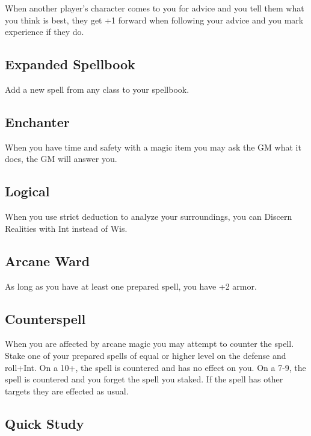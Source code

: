 When another player's character comes to you for advice and you tell them what you think is best, they get +1 forward when following your advice and you mark experience if they do.

 
\subsection{Expanded Spellbook}    
 

Add a new spell from any class to your spellbook.

 
\subsection{Enchanter}   
 

When you have time and safety with a magic item you may ask the GM what it does, the GM will answer you.

 
\subsection{Logical}   
 

When you use strict deduction to analyze your surroundings, you can Discern Realities with Int instead of Wis.

 
\subsection{Arcane Ward}    
 

As long as you have at least one prepared spell, you have +2 armor.

 
\subsection{Counterspell}   
 

When you are affected by arcane magic you may attempt to counter the spell. Stake one of your prepared spells of equal or higher level on the defense and roll+Int. On a 10+, the spell is countered and has no effect on you. On a 7-9, the spell is countered and you forget the spell you staked. If the spell has other targets they are effected as usual.

 
\subsection{Quick Study}    
 

